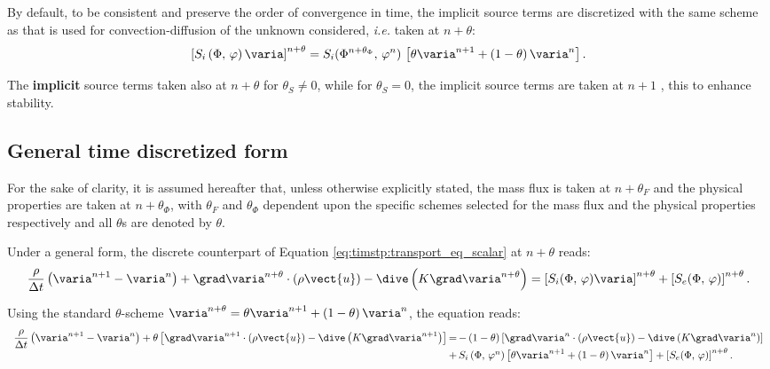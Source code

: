 By default, to be consistent and preserve the order of convergence in time,
the implicit source terms are discretized with the same scheme as that is used
for convection-diffusion of the unknown considered, \emph{i.e.} taken at
$n+\theta $:
\begin{equation}
\left[ S_{i} \left(\Phi , \, \varphi \right) \varia \right]^{n+\theta }
= S_{i}(\Phi^{n+\theta _{\Phi}} , \, \varphi^{n}) \,\left[ \theta \varia^{n+1}+\left(1-\theta \right)\varia^{n} \right].
\end{equation}

\begin{remark}
The \textbf{implicit} source terms taken also at $n+\theta $ for $\theta
_{S}\neq 0$, while for $\theta _{S}=0$, the implicit source terms are taken
at $n+1$ , this to enhance stability.
\end{remark}

\subsection{General time discretized form}

For the sake of clarity, it is assumed hereafter that, unless otherwise
explicitly stated, the mass flux is taken at $n+\theta_F$ and the physical
properties are taken at $n+\theta_\Phi$, with $\theta_F$ and $\theta_\Phi$
dependent upon the specific schemes selected for the mass flux and the
physical properties respectively and all $\theta$s are denoted by $\theta$.

Under a general form, the discrete counterpart of Equation \eqref{eq:timstp:transport_eq_scalar} at
$n+\theta$ reads:
\begin{equation}
\displaystyle \dfrac{\rho}{\Delta t} \left(\varia^{n+1}-\varia^{n}\right)
+ \grad\varia^{n+\theta} \cdot \left(\rho \vect{u} \right)
- \dive \left( K \grad \varia^{n+\theta} \right) =
\left[ S_{i}(\Phi, \, \varphi) \varia \right]^{n+\theta} + \left[S_{e}(\Phi, \, \varphi) \right]^{n+\theta} .
\end{equation}

Using the standard $\theta$-scheme $\varia^{n+\theta}=\theta \varia^{n+1}+\left(1-\theta \right)
\varia^{n}$, the equation reads:
\begin{equation}
\begin{array}{r @{\,} c @{\,} l}
\displaystyle \dfrac{\rho}{\Delta t} \left( \varia^{n+1}-\varia^{n} \right)
+ \theta \left[
\grad \varia^{n+1} \cdot \left( \rho \vect{u} \right)
- \dive \left( K \grad \varia^{n+1} \right)   \right]
&=&
- \left(1-\theta\right) \left[
\grad \varia^{n} \cdot \left( \rho \vect{u} \right)
- \dive \left( K \grad \varia^{n}\right)
\right]
 \\
&+& S_{i}\left(\Phi , \,\varphi^n\right)\left[\theta \varia^{n+1}+ \left(1-\theta \right) \varia^{n}\right]
+ \left[ S_{e}(\Phi, \, \varphi)\right]^{n+\theta}.
\end{array}
\end{equation}


